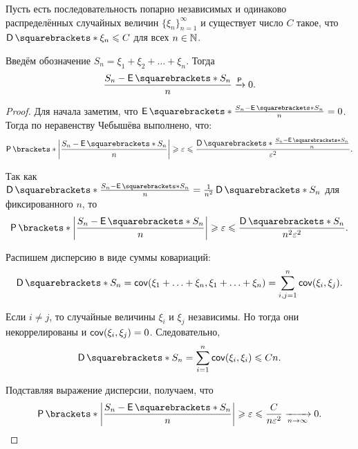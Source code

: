 \begin{theorem}
    Пусть есть последовательность попарно независимых и одинаково распределённых случайных величин \(\{\xi_n\}_{n = 1}^{\infty}\) и существует число \(C\) такое, что \(\D{\xi_n} \leq C\) для всех \(n \in \mathbb{N}\).
    
    Введём обозначение \(S_n = \xi_1 + \xi_2 + \dots + \xi_n\). Тогда
    \[\frac{S_n - \E{S_n}}{n} \prto 0.\]    
\end{theorem}
\begin{proof}
    Для начала заметим, что \(\E{\frac{S_n - \E{S_n}}{n}} = 0\). Тогда по неравенству Чебышёва выполнено, что:
    \[\Pr{\left|\frac{S_n - \E{S_n}}{n}\right| \geq \epsilon} \leq \frac{\D{\frac{S_n - \E{S_n}}{n}}}{\epsilon^2}.\] 
    
    Так как \(\D{\frac{S_n - \E{S_n}}{n}} = \frac{1}{n^2}\D{S_n}\) для фиксированного \(n\), то 
    \[\Pr{\left|\frac{S_n - \E{S_n}}{n}\right| \geq \epsilon} \leq \frac{\D{S_n}}{n^2\epsilon^2}.\]
    
    Распишем дисперсию в виде суммы ковариаций:
    \[\D{S_n} = \cov(\xi_1 + \ldots + \xi_n, \xi_1 + \ldots + \xi_n) = \sum\limits_{i, j = 1}^{n} \cov(\xi_i, \xi_j).\]
    
    Если \(i \neq j\), то случайные величины \(\xi_i\) и \(\xi_j\) независимы. Но тогда они некоррелированы и \(\operatorname{\mathsf{cov}}(\xi_i, \xi_j) = 0\). Следовательно,
    \[\D{S_n} = \sum\limits_{i = 1}^{n} \cov(\xi_i, \xi_i) \leq Cn.\]
    
    Подставляя выражение дисперсии, получаем, что
    \[\Pr{\left|\frac{S_n - \E{S_n}}{n}\right| \geq \epsilon} \leq \frac{C}{n\epsilon^2}\xrightarrow[n \to \infty]{} 0.\qedhere\]
    
	
	
\end{proof}

